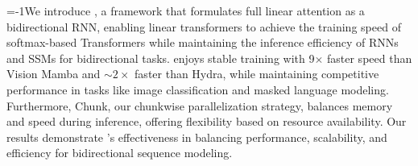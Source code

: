 
\looseness=-1We introduce \lion, a framework that formulates full linear attention as a bidirectional RNN, enabling linear transformers to achieve the training speed of softmax-based Transformers while maintaining the inference efficiency of RNNs and SSMs for bidirectional tasks. \lion enjoys stable training with 9$\times$ faster speed than Vision Mamba and $\sim 2\times$ faster than Hydra, while maintaining competitive performance in tasks like image classification and masked language modeling. Furthermore, \lion Chunk, our chunkwise parallelization strategy, balances memory and speed during inference, offering flexibility based on resource availability. Our results demonstrate \lion's effectiveness in balancing performance, scalability, and efficiency for bidirectional sequence modeling.  






